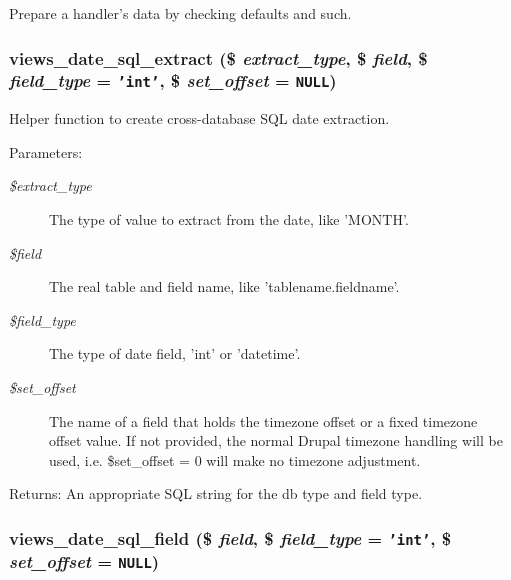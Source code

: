 Prepare a handler's data by checking defaults and such. \hypertarget{handlers_8inc_dd4a1d7bb4ea764872603f9f56afaab1}{
\subsubsection[{views\_\-date\_\-sql\_\-extract}]{\setlength{\rightskip}{0pt plus 5cm}views\_\-date\_\-sql\_\-extract (\$ {\em extract\_\-type}, \/  \$ {\em field}, \/  \$ {\em field\_\-type} = {\tt 'int'}, \/  \$ {\em set\_\-offset} = {\tt NULL})}}
\label{handlers_8inc_dd4a1d7bb4ea764872603f9f56afaab1}


Helper function to create cross-database SQL date extraction.

\begin{Desc}
\item[Parameters:]
\begin{description}
\item[{\em \$extract\_\-type}]The type of value to extract from the date, like 'MONTH'. \item[{\em \$field}]The real table and field name, like 'tablename.fieldname'. \item[{\em \$field\_\-type}]The type of date field, 'int' or 'datetime'. \item[{\em \$set\_\-offset}]The name of a field that holds the timezone offset or a fixed timezone offset value. If not provided, the normal Drupal timezone handling will be used, i.e. \$set\_\-offset = 0 will make no timezone adjustment. \end{description}
\end{Desc}
\begin{Desc}
\item[Returns:]An appropriate SQL string for the db type and field type. \end{Desc}
\hypertarget{handlers_8inc_e61b1af2423ecd6df2332d716f980234}{
\subsubsection[{views\_\-date\_\-sql\_\-field}]{\setlength{\rightskip}{0pt plus 5cm}views\_\-date\_\-sql\_\-field (\$ {\em field}, \/  \$ {\em field\_\-type} = {\tt 'int'}, \/  \$ {\em set\_\-offset} = {\tt NULL})}}
\label{handlers_8inc_e61b1af2423ecd6df2332d716f980234}


